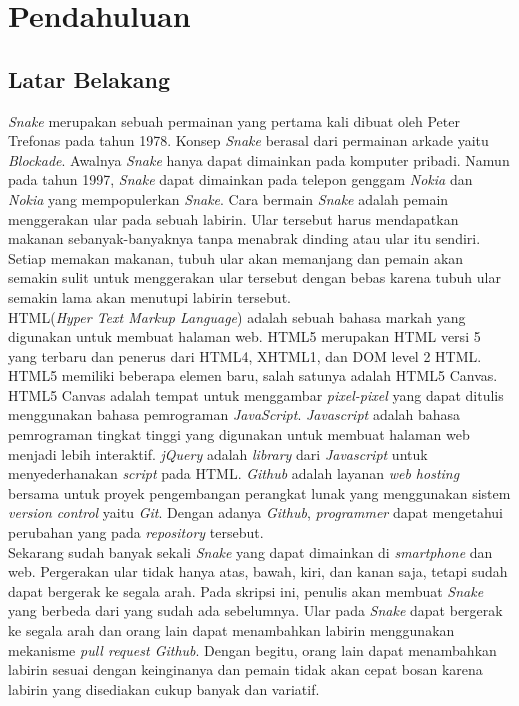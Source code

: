 \chapter{Pendahuluan}
\label{chap:intro}
   
\section{Latar Belakang}
\label{sec:label}

\textit{Snake} merupakan sebuah permainan yang pertama kali dibuat oleh Peter Trefonas pada tahun 1978. Konsep \textit{Snake} berasal dari permainan arkade yaitu \textit{Blockade}. Awalnya \textit{Snake} hanya dapat dimainkan pada komputer pribadi. Namun pada tahun 1997, \textit{Snake} dapat dimainkan pada telepon genggam \textit{Nokia} dan \textit{Nokia} yang mempopulerkan \textit{Snake}. Cara bermain \textit{Snake} adalah pemain menggerakan ular pada sebuah labirin. Ular tersebut harus mendapatkan makanan sebanyak-banyaknya tanpa menabrak dinding atau ular itu sendiri. Setiap memakan makanan, tubuh ular akan memanjang dan pemain akan semakin sulit untuk menggerakan ular tersebut dengan bebas karena tubuh ular semakin lama akan menutupi labirin tersebut. \\

HTML(\textit{Hyper Text Markup Language}) adalah sebuah bahasa markah yang digunakan untuk membuat halaman web. HTML5 merupakan HTML versi 5 yang terbaru dan penerus dari HTML4, XHTML1, dan DOM level 2 HTML. HTML5 memiliki beberapa elemen baru, salah satunya adalah HTML5 Canvas. HTML5 Canvas adalah tempat untuk menggambar \textit{pixel-pixel} yang dapat ditulis menggunakan bahasa pemrograman \textit{JavaScript}. \textit{Javascript} adalah bahasa pemrograman tingkat tinggi yang digunakan untuk membuat halaman web menjadi lebih interaktif. \textit{jQuery} adalah \textit{library} dari \textit{Javascript} untuk menyederhanakan \textit{script} pada HTML. \textit{Github} adalah layanan \textit{web hosting} bersama untuk proyek pengembangan perangkat lunak yang menggunakan sistem \textit{version control} yaitu \textit{Git}. Dengan adanya \textit{Github}, \textit{programmer} dapat mengetahui perubahan yang pada \textit{repository} tersebut. \\

Sekarang sudah banyak sekali \textit{Snake} yang dapat dimainkan di \textit{smartphone} dan web. Pergerakan ular tidak hanya atas, bawah, kiri, dan kanan saja, tetapi sudah dapat bergerak ke segala arah. Pada skripsi ini, penulis akan membuat \textit{Snake} yang berbeda dari yang sudah ada sebelumnya. Ular pada \textit{Snake} dapat bergerak ke segala arah dan orang lain dapat menambahkan labirin menggunakan mekanisme \textit{pull request Github}. Dengan begitu, orang lain dapat menambahkan labirin sesuai dengan keinginanya dan pemain tidak akan cepat bosan karena labirin yang disediakan cukup banyak dan variatif.


